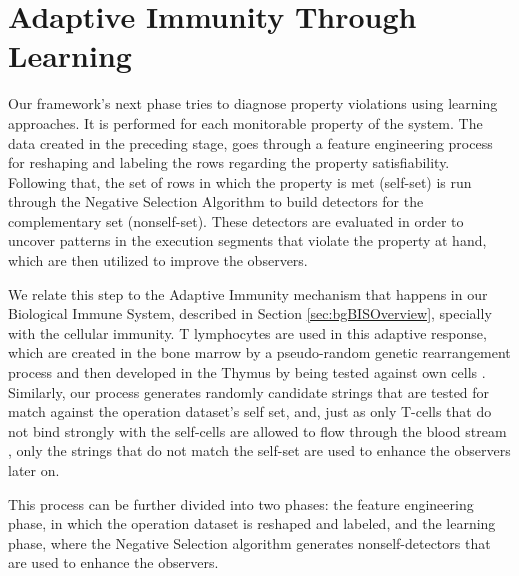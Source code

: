 \section{Adaptive Immunity Through Learning}

Our framework's next phase tries to diagnose property violations using learning approaches. It is performed for each monitorable property of the system. The data created in the preceding stage, goes through a feature engineering process for reshaping and labeling the rows regarding the property satisfiability. Following that, the set of rows in which the property is met (self-set) is run through the Negative Selection Algorithm to build detectors for the complementary set (nonself-set). These detectors are evaluated in order to uncover patterns in the execution segments that violate the property at hand, which are then utilized to improve the observers.


We relate this step to the Adaptive Immunity mechanism that happens in our Biological Immune System, described in Section \ref{sec:bgBISOverview}, specially with the cellular immunity. T lymphocytes are used in this adaptive response, which are created in the bone marrow by a pseudo-random genetic rearrangement process and then developed in the Thymus by being tested against own cells \cite{AIS2014}. Similarly, our process generates randomly candidate strings that are tested for match against the operation dataset's self set, and, just as only T-cells that do not bind strongly with the self-cells are allowed to flow through the blood stream \cite{Kuby2019}, only the strings that do not match the self-set are used to enhance the observers later on.

This process can be further divided into two phases: the feature engineering phase, in which the operation dataset is reshaped and labeled, and the learning phase, where the Negative Selection algorithm generates nonself-detectors that are used to enhance the observers.

